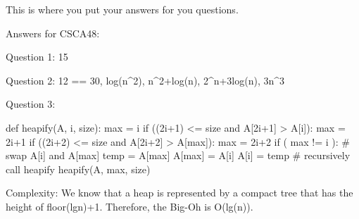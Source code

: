 \documentclass[12pt]{article}
\begin{document}
This is where you put your answers for you questions. 

Answers for CSCA48:

Question 1: 15

Question 2: 12 == 30, log(n^2), n^2+log(n), 2^n+3log(n), 3n^3

Question 3:

def heapify(A, i, size):
	max = i
	if ((2i+1) <= size and A[2i+1] > A[i]):
		max = 2i+1
	if ((2i+2) <= size and A[2i+2] > A[max]):
		max = 2i+2
	if ( max != i ):
		# swap A[i] and A[max]
		temp = A[max]
		A[max] = A[i]
		A[i] = temp
		# recursively call heapify
		heapify(A, max, size)

Complexity:
We know that a heap is represented by a compact tree that has the height of floor(lgn)+1.
Therefore, the Big-Oh is O(lg(n)).
\end{document}
